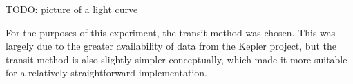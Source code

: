 TODO: picture of a light curve

For the purposes of this experiment, the transit method was chosen. This was largely due to the greater availability of data from the Kepler project,
but the transit method is also slightly simpler conceptually, which made it more suitable for a relatively straightforward implementation.
